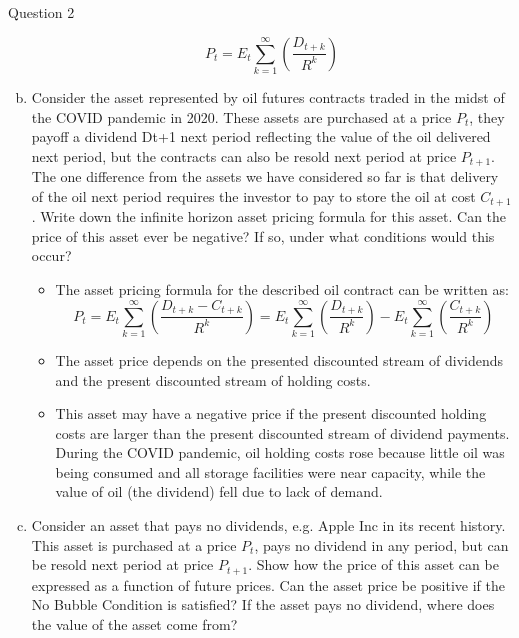 \documentclass[a4paper]{article}
\newif\IfInSansMode
\begin{document}
\begin{questionbox}{Question 2}
\begin{enumerate}[(a)]
\begin{explanationbox}
\[					P_t = E_t \sum_{k=1}^\infty \left( \frac{D_{t+k}}{R^k} \right)
				\]
			\end{explanationbox}
			\item Consider the asset represented by oil futures contracts traded in the midst of the COVID pandemic in 2020. These assets are purchased at a price \( P_t \), they payoff a dividend Dt+1 next period reflecting the value of the oil delivered next period, but the contracts can also be resold next period at price \( P_{t+1} \). The one difference from the assets we have considered so far is that delivery of the oil next period requires the investor to pay to store the oil at cost \( C_{t+1} \). Write down the inﬁnite horizon asset pricing formula for this asset. Can the price of this asset ever be negative? If so, under what conditions would this occur?
			\begin{explanationbox}
				\begin{itemize}
					\item The asset pricing formula for the described oil contract can be written as:
					\[
						P_t = E_t \sum_{k=1}^\infty \left( \frac{D_{t+k} - C_{t+k}}{R^k} \right) = E_t \sum_{k=1}^\infty \left( \frac{D_{t+k}}{R^k} \right) - E_t \sum_{k=1}^\infty \left( \frac{C_{t+k}}{R^k} \right)
					\]
					\item The asset price depends on the presented discounted stream of dividends and the present discounted stream of holding costs.
					\item This asset may have a negative price if the present discounted holding costs are larger than the present discounted stream of dividend payments. During the COVID pandemic, oil holding costs rose because little oil was being consumed and all storage facilities were near capacity, while the value of oil (the dividend) fell due to lack of demand.
				\end{itemize}
			\end{explanationbox}
			\item Consider an asset that pays no dividends, e.g. Apple Inc in its recent history. This asset is purchased at a price \( P_t \), pays no dividend in any period, but can be resold next period at price \( P_{t+1} \). Show how the price of this asset can be expressed as a function of future prices. Can the asset price be positive if the No Bubble Condition is satisﬁed? If the asset pays no dividend, where does the value of the asset come from?
			\begin{explanationbox}
				\begin{itemize}

\end{itemize}
\end{explanationbox}
\end{enumerate}
\end{questionbox}
\end{document}
